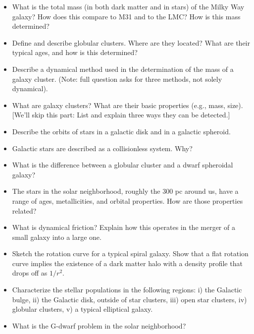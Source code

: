 \documentclass[12pt]{article}
\begin{document}
\begin{itemize}
\item What is the total mass (in both dark matter and in stars) of the
  Milky Way galaxy? How does this compare to M31 and to the LMC? How
  is this mass determined?
\item Define and describe globular clusters. Where are they located?
  What are their typical ages, and how is this determined?
\item Describe a dynamical method used in the determination of the
  mass of a galaxy cluster. (Note: full question asks for three
  methods, not solely dynamical).
\item What are galaxy clusters? What are their basic properties (e.g.,
  mass, size). [We'll skip this part: List and explain three ways they
    can be detected.]
\item Describe the orbits of stars in a galactic disk and in a
  galactic spheroid.
\item Galactic stars are described as a collisionless system. Why?
\item What is the difference between a globular cluster and a dwarf
  spheroidal galaxy?
\item The stars in the solar neighborhood, roughly the 300 pc around
  us, have a range of ages, metallicities, and orbital properties. How
  are those properties related?
\item What is dynamical friction? Explain how this operates in the
  merger of a small galaxy into a large one.
\item Sketch the rotation curve for a typical spiral galaxy. Show that
  a flat rotation curve implies the existence of a dark matter halo
  with a density profile that drops off as $1/r^2$.
\item Characterize the stellar populations in the following regions:
  i) the Galactic bulge, ii) the Galactic disk, outside of star
  clusters, iii) open star clusters, iv) globular clusters, v) a
  typical elliptical galaxy.
\item What is the G-dwarf problem in the solar neighborhood?
\end{itemize}
\end{document}
